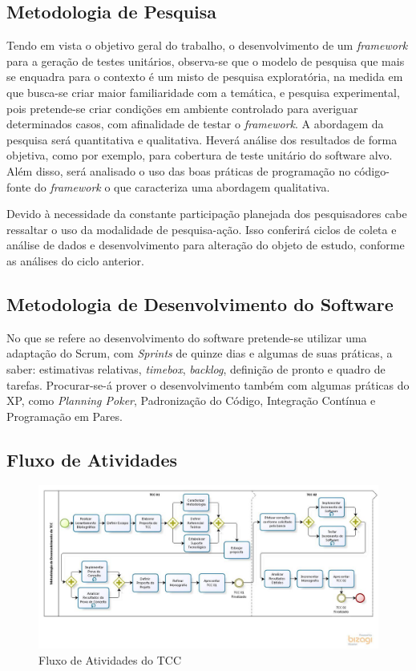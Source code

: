   \subsection{Metodologia de Pesquisa}
  Tendo em vista o objetivo geral do trabalho, o desenvolvimento de um \textit{framework} para a geração de testes unitários, observa-se que o modelo de pesquisa que mais se enquadra para o contexto é um misto de pesquisa exploratória, na medida em que busca-se criar maior familiaridade com a temática, e pesquisa experimental, pois pretende-se criar condições em ambiente controlado para averiguar determinados casos, com afinalidade de testar o \textit{framework}. A abordagem da pesquisa será quantitativa e qualitativa. Heverá análise dos resultados de forma objetiva, como por exemplo, para cobertura de teste unitário do software alvo. Além disso, será analisado o uso das boas práticas de programação no código-fonte do \textit{framework} o que caracteriza uma abordagem qualitativa.
  \par
  \indent Devido à necessidade da constante participação planejada dos pesquisadores cabe ressaltar o uso da modalidade de pesquisa-ação. Isso conferirá ciclos de coleta e análise de dados e desenvolvimento para alteração do objeto de estudo, conforme as análises do ciclo anterior.

 \subsection{Metodologia de Desenvolvimento do Software}
  No que se refere ao desenvolvimento do software pretende-se utilizar uma adaptação do Scrum, com \textit{Sprints} de quinze dias e algumas de suas práticas, a saber: estimativas relativas, \textit{timebox}, \textit{backlog}, definição de pronto e quadro de tarefas. Procurar-se-á prover o desenvolvimento também com algumas práticas do XP, como \textit{Planning Poker}, Padronização do Código, Integração Contínua e Programação em Pares.
 
 \subsection{Fluxo de Atividades}
  \begin{figure}[h]
    \centering
    \includegraphics[width=\textwidth, natwidth= 300, natheight=300]{figuras/processo.jpg}
    \caption{Fluxo de Atividades do TCC}
    \label{fig:processo}
  \end{figure}
 
